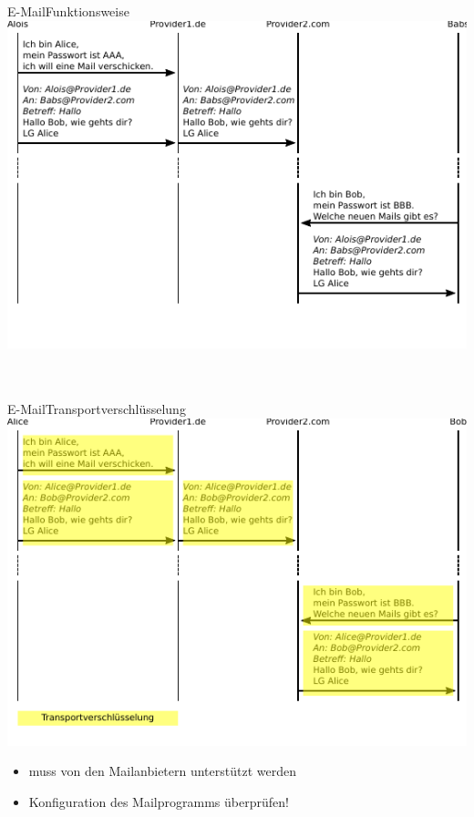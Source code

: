   \begin{frame}{E-Mail}{Funktionsweise}
    \includegraphics[width=\textwidth]{images/maildaten.pdf}
    \scriptsize
    ~\\
    ~\\
  \end{frame}

  \begin{frame}{E-Mail}{Transportverschlüsselung}
    \includegraphics[width=\textwidth]{images/maildaten_trans.pdf}
    \begin{itemize}
      \scriptsize
      \item muss von den Mailanbietern unterstützt werden
      \item Konfiguration des Mailprogramms überprüfen!
    \end{itemize}
  \end{frame}

